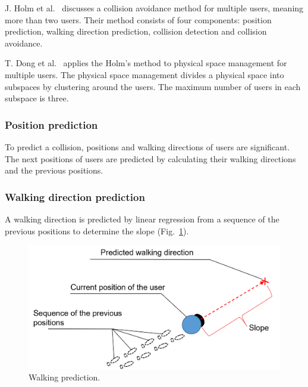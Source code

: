 J. Holm et al.~\cite{6549377} discusses a collision avoidance method for multiple users, meaning more than two users. Their method consists of four components: position prediction,  walking direction prediction, collision detection and collision avoidance.

T. Dong et al.~\cite{8798319} applies the Holm's method to physical space management for multiple users. The physical space management divides a physical space into subspaces by clustering around the users. The maximum number of users in each subspace is three.



\subsubsection{Position prediction}
 To predict a collision, positions and walking directions of users are significant. The next positions of users are predicted by calculating their walking directions and the previous positions.
\subsubsection{Walking direction prediction}

A walking direction is predicted by linear regression from a sequence of the previous positions to determine the slope (Fig.~\ref{fig:Walking prediction}).





\begin{figure}[H]\centering
	\includegraphics[width=1.0\textwidth]{Pictures/Walking prediction.png}%
	\caption{Walking prediction.}\label{fig:Walking prediction}%
	
\end{figure}




